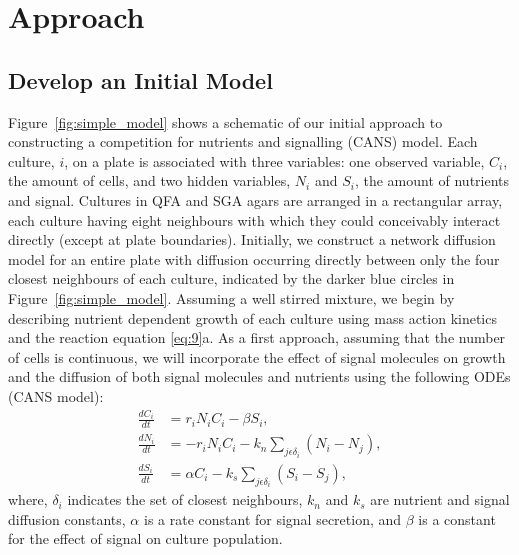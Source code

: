 \graphicspath{{images_low_res/}}
\section{Approach}
\label{sec:approach}

\subsection{Develop an Initial Model}
\label{sec:initial_model}

Figure~\ref{fig:simple_model} shows a schematic of our initial
approach to constructing a competition for nutrients and signalling
(CANS) model. Each culture, \(i\), on a plate is associated with three
variables: one observed variable, \(C_{i}\), the amount of cells, and
two hidden variables, \(N_{i}\) and \(S_{i}\), the amount of nutrients
and signal. Cultures in QFA and SGA agars are arranged in a
rectangular array, each culture having eight neighbours with which
they could conceivably interact directly (except at plate
boundaries). Initially, we construct a network diffusion model for an
entire plate with diffusion occurring directly between only the four
closest neighbours of each culture, indicated by the darker blue
circles in Figure~\ref{fig:simple_model}. Assuming a well stirred
mixture, we begin by describing nutrient dependent growth of each
culture using mass action kinetics and the reaction equation
\ref{eq:9}a. As a first approach, assuming that the number of cells
is continuous, we will incorporate the effect of signal molecules on
growth and the diffusion of both signal molecules and nutrients using
the following ODEs (CANS model):
\begin{subequations}
  \label{eq:5}
  \begin{align}
    \frac{dC_{i}}{dt}& = r_{i}N_{i}C_{i} - \beta S_{i},\\
    \frac{dN_{i}}{dt}& = - r_{i}N_{i}C_{i} - k_{n}\sum_{j \epsilon \delta_i}(N_{i} - N_{j}),\\
    \frac{dS_{i}}{dt}& = \alpha C_{i} - k_{s}\sum_{j \epsilon \delta_i}(S_{i} - S_{j}),
  \end{align}
\end{subequations}
where, \(\delta_i\) indicates the set of closest neighbours, \(k_{n}\)
and \(k_{s}\) are nutrient and signal diffusion constants, \(\alpha\)
is a rate constant for signal secretion, and \(\beta\) is a constant
for the effect of signal on culture population.


